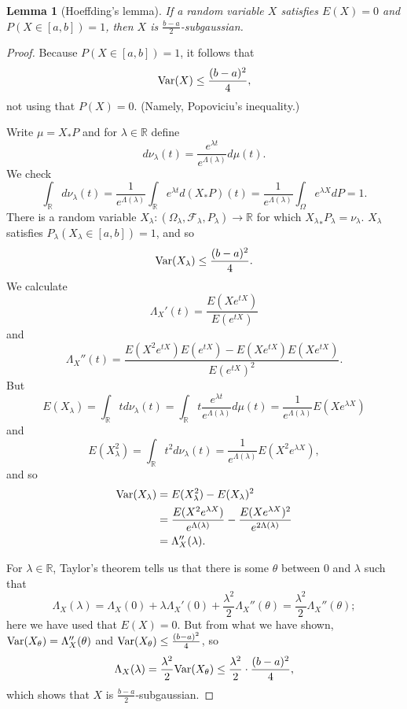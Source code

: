 \documentclass{article}
\newcommand{\Var}{\ensuremath\mathrm{Var}}
\newtheorem{lemma}[theorem]{Lemma}
\theoremstyle{definition}
\begin{document}
\begin{lemma}[Hoeffding's lemma]
If a random variable $X$ satisfies $E(X)=0$ and $P(X \in [a,b])=1$, then $X$ is $\frac{b-a}{2}$-subgaussian.
\end{lemma}
\begin{proof}
Because $P(X \in [a,b]) =1$, it follows that
\[
\Var(X) \leq \frac{(b-a)^2}{4},
\]
not using that $P(X)=0$. (Namely, Popoviciu's inequality.)

Write $\mu = X_*P$
and for $\lambda \in \mathbb{R}$ define
\[
d\nu_\lambda(t) = \frac{e^{\lambda t}}{e^{\Lambda(\lambda)}} d\mu(t).
\]
We check
\[
\int_\mathbb{R} d\nu_\lambda(t) =\frac{1}{e^{\Lambda(\lambda)}} \int_\mathbb{R} 
e^{\lambda t} d(X_*P)(t)
=\frac{1}{e^{\Lambda(\lambda)}} \int_\Omega e^{\lambda X} dP
=1.
\]
There is a random variable $X_\lambda:(\Omega_\lambda,\mathscr{F}_\lambda,P_\lambda) \to \mathbb{R}$ for which ${X_\lambda}_*P_\lambda=\nu_\lambda$. 
$X_\lambda$ satisfies $P_\lambda(X_\lambda \in [a,b])=1$, and so 
\[
\Var(X_\lambda) \leq \frac{(b-a)^2}{4}.
\]
We calculate
\[
\Lambda_X'(t) = \frac{E(Xe^{tX})}{E(e^{tX})}
\]
and
\[
\Lambda_X''(t) = \frac{E(X^2 e^{tX}) E(e^{tX}) - E(Xe^{tX})E(Xe^{tX})}{E(e^{tX})^2}.
\]
But
\[
E(X_\lambda) =\int_\mathbb{R} t d\nu_\lambda(t) 
=\int_\mathbb{R} t \frac{e^{\lambda t}}{e^{\Lambda(\lambda)}} d\mu(t)
=\frac{1}{e^{\Lambda(\lambda)}} E(Xe^{\lambda X})
\]
and
\[
E(X_\lambda^2) = \int_\mathbb{R} t^2 d\nu_\lambda(t) = \frac{1}{e^{\Lambda(\lambda)}} E(X^2 e^{\lambda X}),
\]
and so
\begin{align*}
\Var(X_\lambda)& =E(X_\lambda^2)-E(X_\lambda)^2\\
&= \frac{E(X^2 e^{\lambda X})}{e^{\Lambda(\lambda)}}  - \frac{E(Xe^{\lambda X})^2}{e^{2\Lambda(\lambda)}}\\
&=\Lambda_X''(\lambda).
\end{align*}

For $\lambda \in \mathbb{R}$, Taylor's theorem tells us that there is some $\theta$ between $0$ and $\lambda$ such that
\[
\Lambda_X(\lambda) = \Lambda_X(0)+\lambda \Lambda_X'(0)
+\frac{\lambda^2}{2} \Lambda_X''(\theta)
=\frac{\lambda^2}{2} \Lambda_X''(\theta);
\]
here we have used that $E(X)=0$.
But from what we have shown, $\Var(X_\theta)=\Lambda_X''(\theta)$ and $\Var(X_\theta) \leq \frac{(b-a)^2}{4}$, so
\[
\Lambda_X(\lambda)  = \frac{\lambda^2}{2} \Var(X_\theta) \leq 
\frac{\lambda^2}{2} \cdot \frac{(b-a)^2}{4},
\] 
which shows that $X$ is $\frac{b-a}{2}$-subgaussian.
\end{proof}
\end{document}
